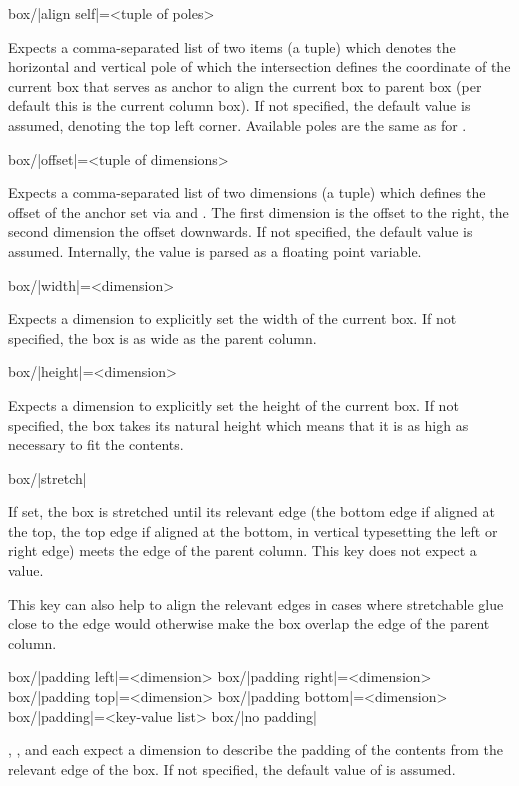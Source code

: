 \documentclass[a4paper]{article}
\begin{document}
\begin{macrodef}
box/|align self|={<tuple of poles>}
\end{macrodef}
Expects a comma-separated list of two items (a tuple) which denotes the horizontal and vertical pole of which the intersection defines the coordinate of the current box that serves as anchor to align the current box to parent box (per default this is the current column box). If not specified, the default value  is assumed, denoting the top left corner. Available poles are the same as for .

\begin{macrodef}
box/|offset|={<tuple of dimensions>}
\end{macrodef}
Expects a comma-separated list of two dimensions (a tuple) which defines the offset of the anchor set via  and . The first dimension is the offset to the right, the second dimension the offset downwards. If not specified, the default value \macro{0mm, 0mm} is assumed. Internally, the value is parsed as a floating point variable.

\begin{macrodef}
box/|width|={<dimension>}
\end{macrodef}
Expects a dimension to explicitly set the width of the current box. If not specified, the box is as wide as the parent column.

\begin{macrodef}
box/|height|={<dimension>}
\end{macrodef}
Expects a dimension to explicitly set the height of the current box. If not specified, the box takes its natural height which means that it is as high as necessary to fit the contents.

\begin{macrodef}
box/|stretch|
\end{macrodef}
If set, the box is stretched until its relevant edge (the bottom edge if aligned at the top, the top edge if aligned at the bottom, in vertical typesetting the left or right edge) meets the edge of the parent column. This key does not expect a value.

This key can also help to align the relevant edges in cases where stretchable glue close to the edge would otherwise make the box overlap the edge of the parent column.

\begin{macrodef}
box/|padding left|={<dimension>}
box/|padding right|={<dimension>}
box/|padding top|={<dimension>}
box/|padding bottom|={<dimension>}
box/|padding|={<key-value list>}
box/|no padding|
\end{macrodef}
, ,  and  each expect a dimension to describe the padding of the contents from the relevant edge of the box. If not specified, the default value of \macro{7.5mm} is assumed.
\end{document}
